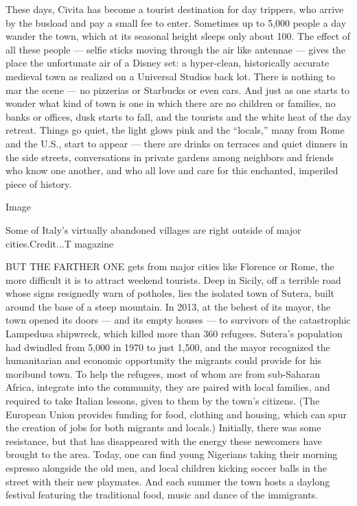 These days, Civita has become a tourist destination for day trippers,
who arrive by the busload and pay a small fee to enter. Sometimes up to
5,000 people a day wander the town, which at its seasonal height sleeps
only about 100. The effect of all these people --- selfie sticks moving
through the air like antennae --- gives the place the unfortunate air of
a Disney set: a hyper-clean, historically accurate medieval town as
realized on a Universal Studios back lot. There is nothing to mar the
scene --- no pizzerias or Starbucks or even cars. And just as one starts
to wonder what kind of town is one in which there are no children or
families, no banks or offices, dusk starts to fall, and the tourists and
the white heat of the day retreat. Things go quiet, the light glows pink
and the ``locals,'' many from Rome and the U.S., start to appear ---
there are drinks on terraces and quiet dinners in the side streets,
conversations in private gardens among neighbors and friends who know
one another, and who all love and care for this enchanted, imperiled
piece of history.

Image

Some of Italy's virtually abandoned villages are right outside of major
cities.Credit...T magazine

BUT THE FARTHER ONE gets from major cities like Florence or Rome, the
more difficult it is to attract weekend tourists. Deep in Sicily, off a
terrible road whose signs resignedly warn of potholes, lies the isolated
town of Sutera, built around the base of a steep mountain. In 2013, at
the behest of its mayor, the town opened its doors --- and its empty
houses --- to survivors of the catastrophic Lampedusa shipwreck, which
killed more than 360 refugees. Sutera's population had dwindled from
5,000 in 1970 to just 1,500, and the mayor recognized the humanitarian
and economic opportunity the migrants could provide for his moribund
town. To help the refugees, most of whom are from sub-Saharan Africa,
integrate into the community, they are paired with local families, and
required to take Italian lessons, given to them by the town's citizens.
(The European Union provides funding for food, clothing and housing,
which can spur the creation of jobs for both migrants and locals.)
Initially, there was some resistance, but that has disappeared with the
energy these newcomers have brought to the area. Today, one can find
young Nigerians taking their morning espresso alongside the old men, and
local children kicking soccer balls in the street with their new
playmates. And each summer the town hosts a daylong festival featuring
the traditional food, music and dance of the immigrants.

